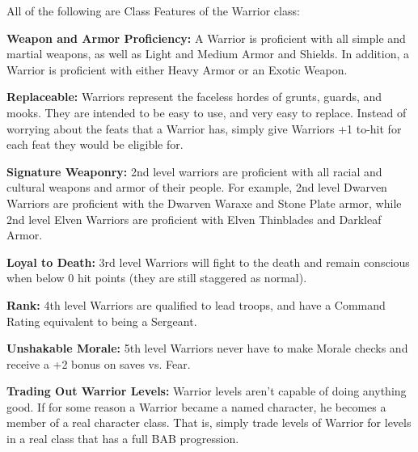 All of the following are Class Features of the Warrior class:

\textbf{Weapon and Armor Proficiency:} A Warrior is proficient with all simple and martial weapons, as well as Light and Medium Armor and Shields. In addition, a Warrior is proficient with either Heavy Armor or an Exotic Weapon.

\textbf{Replaceable:} Warriors represent the faceless hordes of grunts, guards, and mooks. They are intended to be easy to use, and very easy to replace. Instead of worrying about the feats that a Warrior has, simply give Warriors +1 to-hit for each feat they would be eligible for.

\textbf{Signature Weaponry:} 2nd level warriors are proficient with all racial and cultural weapons and armor of their people. For example, 2nd level Dwarven Warriors are proficient with the Dwarven Waraxe and Stone Plate armor, while 2nd level Elven Warriors are proficient with Elven Thinblades and Darkleaf Armor.

\textbf{Loyal to Death:} 3rd level Warriors will fight to the death and remain conscious when below 0 hit points (they are still staggered as normal).

\textbf{Rank:} 4th level Warriors are qualified to lead troops, and have a Command Rating equivalent to being a Sergeant.

\textbf{Unshakable Morale:} 5th level Warriors never have to make Morale checks and receive a +2 bonus on saves vs. Fear.

\textbf{Trading Out Warrior Levels:} Warrior levels aren't capable of doing anything good. If for some reason a Warrior became a named character, he becomes a member of a real character class. That is, simply trade levels of Warrior for levels in a real class that has a full BAB progression.